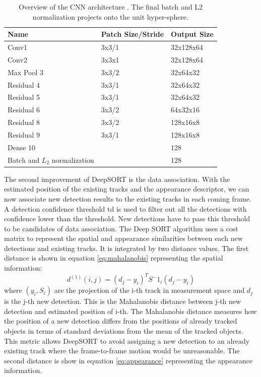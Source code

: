 \begin{table}[]
	\label{tab:desarchitecture}
	\begin{tabular}{|l|l|l|}
		\hline
		Name                       & Patch Size/Stride & Output Size \\ \hline
		Conv1                      & 3x3/1             & 32x128x64   \\ \hline
		Conv2                      & 3x3x1             & 32x128x64   \\ \hline
		Max Pool 3                 & 3x3/2             & 32x64x32    \\ \hline
		Residual 4                 & 3x3/1             & 32x64x32    \\ \hline
		Residual 5                 & 3x3/1             & 32x64x32    \\ \hline
		Residual 6                 & 3x3/2             & 64x32x16    \\ \hline
		Residual 8                 & 3x3/2             & 128x16x8    \\ \hline
		Residual 9                 & 3x3/1             & 128x16x8    \\ \hline
		Dense 10                   &                   & 128         \\ \hline
		Batch and \(L_2\) normalization &                   & 128         \\ \hline
	\end{tabular}
	\caption{Overview of the CNN architecture \cite{DBLP:journals/corr/WojkeBP17}. The final batch and L2 normalization projects onto the unit hyper-sphere.}
\end{table}
The second improvement of DeepSORT is the data association. With the estimated position of the existing tracks and the appearance descriptor, we can now associate new detection results to the existing tracks in each coming frame. A detection confidence threshold td is used to filter out all the detections with confidence lower than the threshold. New detections have to pass this threshold to be candidates of data association. The Deep SORT algorithm uses a cost matrix to represent the spatial and appearance similarities between each new detections and existing tracks. It is integrated by two distance values. The first distance is shown in equation \ref{eq:mahalanobis} representing the spatial information:
\begin{equation}
	\label{eq:mahalanobis}
	d^{(1)}(i,j)=(d_j-y_i)^TS^-1_i(d_j-y_i)
\end{equation}
where \((y_i, S_i)\) are the projection of the i-th track in measurement space and \(d_j\) is the j-th new detection. This is the Mahalanobis distance \cite{hastie2009elements} between j-th new detection and estimated position of i-th. The Mahalanobis distance measures how the position of a new detection differs from the positions of already tracked objects in terms of standard deviations from the mean of the tracked objects. This metric allows DeepSORT to avoid assigning a new detection to an already existing track where the frame-to-frame motion would be unreasonable. The second distance is show in equation \ref{eq:appearance} representing the appearance information.
